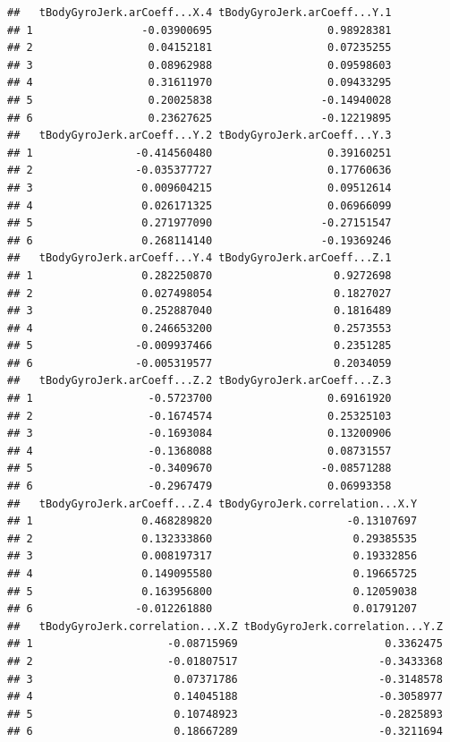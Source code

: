 \documentclass[
]{article}
\begin{document}
\begin{verbatim}
##   tBodyGyroJerk.arCoeff...X.4 tBodyGyroJerk.arCoeff...Y.1
## 1                 -0.03900695                  0.98928381
## 2                  0.04152181                  0.07235255
## 3                  0.08962988                  0.09598603
## 4                  0.31611970                  0.09433295
## 5                  0.20025838                 -0.14940028
## 6                  0.23627625                 -0.12219895
##   tBodyGyroJerk.arCoeff...Y.2 tBodyGyroJerk.arCoeff...Y.3
## 1                -0.414560480                  0.39160251
## 2                -0.035377727                  0.17760636
## 3                 0.009604215                  0.09512614
## 4                 0.026171325                  0.06966099
## 5                 0.271977090                 -0.27151547
## 6                 0.268114140                 -0.19369246
##   tBodyGyroJerk.arCoeff...Y.4 tBodyGyroJerk.arCoeff...Z.1
## 1                 0.282250870                   0.9272698
## 2                 0.027498054                   0.1827027
## 3                 0.252887040                   0.1816489
## 4                 0.246653200                   0.2573553
## 5                -0.009937466                   0.2351285
## 6                -0.005319577                   0.2034059
##   tBodyGyroJerk.arCoeff...Z.2 tBodyGyroJerk.arCoeff...Z.3
## 1                  -0.5723700                  0.69161920
## 2                  -0.1674574                  0.25325103
## 3                  -0.1693084                  0.13200906
## 4                  -0.1368088                  0.08731557
## 5                  -0.3409670                 -0.08571288
## 6                  -0.2967479                  0.06993358
##   tBodyGyroJerk.arCoeff...Z.4 tBodyGyroJerk.correlation...X.Y
## 1                 0.468289820                     -0.13107697
## 2                 0.132333860                      0.29385535
## 3                 0.008197317                      0.19332856
## 4                 0.149095580                      0.19665725
## 5                 0.163956800                      0.12059038
## 6                -0.012261880                      0.01791207
##   tBodyGyroJerk.correlation...X.Z tBodyGyroJerk.correlation...Y.Z
## 1                     -0.08715969                       0.3362475
## 2                     -0.01807517                      -0.3433368
## 3                      0.07371786                      -0.3148578
## 4                      0.14045188                      -0.3058977
## 5                      0.10748923                      -0.2825893
## 6                      0.18667289                      -0.3211694

\end{verbatim}
\end{document}
